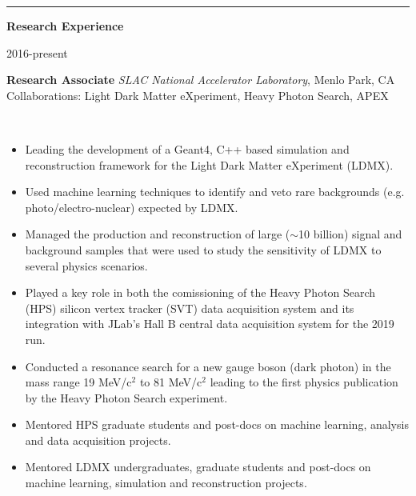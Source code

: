 \documentclass[11pt]{article}
\newcommand{\cvsection}[1] {
    \noindent
    \textcolor{indigodye}{\rule{.15\textwidth}{.1in} \hspace{0.01 \textwidth} \textbf{\Large{#1}}} \newline 
}
\newcommand{\experienceentrycollab}[6] { 
    \noindent
    \begin{minipage}[t]{0.15\textwidth} \begin{flushright} #1 \end{flushright} \end{minipage} \hspace{0.01\textwidth}
    \begin{minipage}[t]{0.84\textwidth} 
        \textbf{#2} \newline
        \emph{#3}, #4 \newline
        Collaborations: #5
    \end{minipage} \\[0.01pt]
    #6 \vspace{11pt}
}
\begin{document}
    \cvsection{Research Experience}
        \experienceentrycollab{2016-present}
                        {Research Associate}
                        {SLAC National Accelerator Laboratory}
                        {Menlo Park, CA}
                        {Light Dark Matter eXperiment, Heavy Photon Search, APEX}
                        {   
                            \begin{itemize}[label=\textcolor{indigodye}{$\circ$}, noitemsep, nolistsep, leftmargin=0.19\textwidth]
                                \item Leading the development of a Geant4, C++ based simulation and reconstruction 
                                      framework for the Light Dark Matter eXperiment (LDMX).
                                \item Used machine learning techniques to identify and veto rare backgrounds (e.g.
                                      photo/electro-nuclear) expected by LDMX.
                                \item Managed the production and reconstruction of large ($\sim$10 billion) signal and
                                      background samples that were used to study the sensitivity of LDMX to several 
                                      physics scenarios.
                                \item Played a key role in both the comissioning of the Heavy Photon Search 
                                      (HPS) silicon vertex tracker (SVT) data acquisition system and its integration
                                      with JLab's Hall B central data acquisition system for the 2019 run.
                                \item Conducted a resonance search for a new gauge boson (dark photon) in the mass range 
                                      19 MeV/c$^2$ to 81 MeV/c$^2$ leading to the first physics publication by the
                                      Heavy Photon Search experiment.
                                \item Mentored HPS graduate students and post-docs on machine learning, 
                                      analysis and data acquisition projects.
                                \item Mentored LDMX undergraduates, graduate students and post-docs on 
                                      machine learning, simulation and reconstruction projects.
                            \end{itemize} 
                        } 
\end{document}
